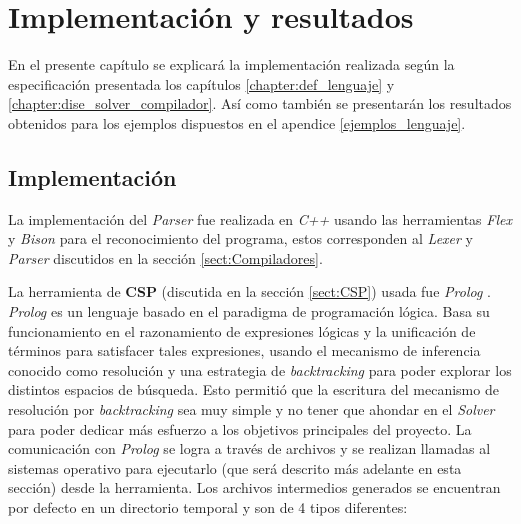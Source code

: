 \chapter{Implementación y resultados}\label{chapter:imp_y_res}

En el presente capítulo se explicará la implementación realizada según la 
especificación presentada los capítulos \ref{chapter:def_lenguaje} y \ref{chapter:dise_solver_compilador}. Así como
también se presentarán los resultados obtenidos para los ejemplos dispuestos en el apendice 
\ref{ejemplos_lenguaje}.

\section{Implementación}
La implementación del \emph{Parser} fue realizada en \emph{C++} usando las herramientas \emph{Flex}
\cite{Flex} y \emph{Bison} \cite{Bison} para el reconocimiento del programa, estos 
corresponden al \emph{Lexer} y \emph{Parser} discutidos en la sección \ref{sect:Compiladores}.

La herramienta de \textbf{CSP} (discutida en la sección \ref{sect:CSP}) usada fue \emph{Prolog}
\cite{Prolog}. \emph{Prolog} es un lenguaje basado en el paradigma de programación
lógica. Basa su funcionamiento en el razonamiento de expresiones lógicas y la 
unificación de términos para satisfacer tales expresiones, usando el mecanismo 
de inferencia conocido como resolución y una estrategia de \emph{backtracking} para 
poder explorar los distintos espacios de búsqueda.
Esto permitió que la escritura del mecanismo de resolución por \emph{backtracking} sea
muy simple y no tener que ahondar en el \emph{Solver} para poder dedicar más esfuerzo
a los objetivos principales del proyecto.
La comunicación con \emph{Prolog} se logra a través de archivos y se realizan llamadas al sistemas
operativo para ejecutarlo (que será descrito más adelante en esta sección)
desde la herramienta. Los archivos intermedios generados se 
encuentran por defecto en un directorio temporal y son de 4 tipos diferentes:


